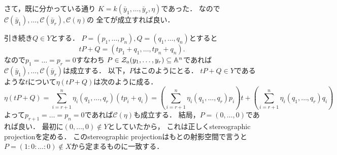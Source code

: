 \documentclass[a4paper]{jsarticle}
\newcommand{\cond}{\mathcal{C}}
\begin{document}
    さて，既に分かっている通り
    $K=k(\bar{y}_1,\dots,\bar{y}_r, \eta)$であった．
    なので$\cond(\bar{y}_1),\dots,\cond(\bar{y}_r), \cond(\eta)$の
    全てが成立すれば良い．

    引き続き$Q \in Y$とする．
    $P=(p_1, \dots, p_n), Q=(q_1, \dots, q_n)$とすると
    \[ tP+Q=(tp_1+q_1, \dots, tp_n+q_n). \]
    なので$p_1=\dots=p_r=0$すなわち
    $P \in \mathcal{Z}_a(y_1,\dots,y_r) \subseteq \mathbb{A}^n$であれば
    $\cond(\bar{y}_1),\dots,\cond(\bar{y}_r)$は成立する．
    以下，$P$はこのようにとる．
    $tP+Q \in Y$であるような$t$について$\eta(tP+Q)$は次のように成る．
    \[
        \eta(tP+Q)
        =\sum_{i=r+1}^{n} \eta_i(q_1,\dots,q_r) (tp_i+q_i)
        =\left( \sum_{i=r+1}^{n} \eta_i(q_1,\dots,q_r)p_i \right)t+\left( \sum_{i=r+1}^{n} \eta_i(q_1,\dots,q_r)q_i \right)
    \]
    よって$p_{r+1}=\dots=p_{n}=0$であれば$\cond(\eta)$も成立する．
    結局，$P=(0,\dots,0)$であれば良い．
    最初に$(0,\dots,0) \not \in Y$としていたから，
    これは正しくstereographic projectionを定める．
    このstereographic projectionはもとの射影空間で言うと
    $P=(1:0:\dots:0) \not \in X$から定まるものに一致する．
\end{document}
